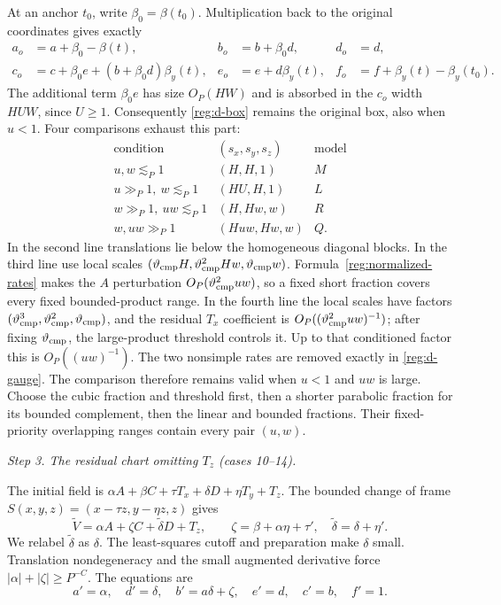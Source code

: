 \documentclass[11pt]{amsart}
\theoremstyle{definition}
\theoremstyle{remark}
\numberwithin{equation}{section}
\begin{document}
At an anchor $t_0$, write $\beta_0=\beta(t_0)$. Multiplication back to the original coordinates gives exactly
\[
\begin{aligned}
a_o&=a+\beta_0-\beta(t),&b_o&=b+\beta_0d,&d_o&=d,\\
c_o&=c+\beta_0e+(b+\beta_0d)\beta_y(t),&e_o&=e+d\beta_y(t),&f_o&=f+\beta_y(t)-\beta_y(t_0).
\end{aligned}
\]
The additional term $\beta_0e$ has size $O_P(HW)$ and is absorbed in the $c_o$ width $HUW$, since $U\ge1$. Consequently \eqref{reg:d-box} remains the original box, also when $u<1$. Four comparisons exhaust this part:
\[
\begin{array}{c|c|c}
\text{condition}&(s_x,s_y,s_z)&\text{model}\\\hline
u,w\lesssim_P1&(H,H,1)&M\\
u\gg_P1,\ w\lesssim_P1&(HU,H,1)&L\\
w\gg_P1,\ uw\lesssim_P1&(H,Hw,w)&R\\
w,uw\gg_P1&(Huw,Hw,w)&Q.
\end{array}
\]
In the second line translations lie below the homogeneous diagonal blocks. In the third line use local scales $(\vartheta_{\rm cmp} H,\vartheta_{\rm cmp}^2Hw,\vartheta_{\rm cmp} w)$. Formula~\eqref{reg:normalized-rates} makes the $A$ perturbation $O_P(\vartheta_{\rm cmp}^2uw)$, so a fixed short fraction covers every fixed bounded-product range. In the fourth line the local scales have factors $(\vartheta_{\rm cmp}^3,\vartheta_{\rm cmp}^2,\vartheta_{\rm cmp})$, and the residual $T_x$ coefficient is $O_P((\vartheta_{\rm cmp}^2uw)^{-1})$; after fixing $\vartheta_{\rm cmp}$, the large-product threshold controls it. Up to that conditioned factor this is $O_P((uw)^{-1})$. The two nonsimple rates are removed exactly in \eqref{reg:d-gauge}. The comparison therefore remains valid when $u<1$ and $uw$ is large. Choose the cubic fraction and threshold first, then a shorter parabolic fraction for its bounded complement, then the linear and bounded fractions. Their fixed-priority overlapping ranges contain every pair $(u,w)$.

\par\medskip\noindent\textit{Step 3. The residual chart omitting $T_z$ (cases 10--14).}\par\nobreak\smallskip
The initial field is $\alpha A+\beta C+\tau T_x+\delta D+\eta T_y+T_z$. The bounded change of frame $S(x,y,z)=(x-\tau z,y-\eta z,z)$ gives
\[
\widetilde V=\alpha A+\zeta C+\widetilde\delta D+T_z,\qquad \zeta=\beta+\alpha\eta+\tau',\quad \widetilde\delta=\delta+\eta'.
\]
We relabel $\widetilde\delta$ as $\delta$. The least-squares cutoff and preparation make $\delta$ small. Translation nondegeneracy and the small augmented derivative force $|\alpha|+|\zeta|\ge P^{-C}$. The equations are
\[
a'=\alpha,\quad d'=\delta,\quad b'=a\delta+\zeta,\quad e'=d,\quad c'=b,\quad f'=1.
\]
\end{document}
